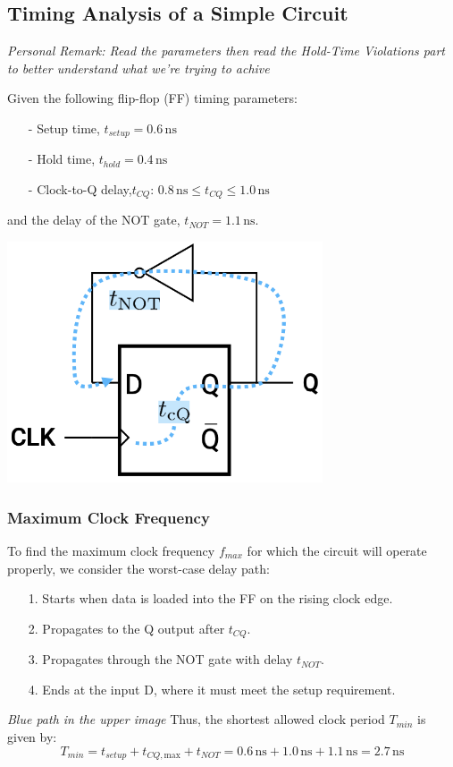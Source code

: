 \documentclass[12pt,openany]{book}
\begin{document}
\subsection{Timing Analysis of a Simple Circuit}
\textit{Personal Remark: Read the parameters then read the Hold-Time Violations part to better understand what we're trying to achive} \newline \vspace*{5px}
\begin{minipage}{0.4\textwidth}
	Given the following flip-flop (FF) timing parameters:
	\begin{itemize}
	    \item[-] Setup time, $t_{setup} = 0.6 \, \text{ns}$
	    \item[-] Hold time, $t_{hold} = 0.4 \, \text{ns}$
	    \item[-] Clock-to-Q delay,\newline $t_{CQ}$: $0.8 \, \text{ns} \le t_{CQ} \le 1.0 \, \text{ns}$
	\end{itemize}
	and the delay of the NOT gate, $t_{NOT} = 1.1 \, \text{ns}$.
\end{minipage}
\hfill
\begin{minipage}{0.5\textwidth}
	\centering
	\includegraphics[width=0.7\textwidth]{circuits/15.1.2_4.png}
\end{minipage}
\subsubsection{Maximum Clock Frequency}

To find the maximum clock frequency $f_{max}$ for which the circuit will operate properly, we consider the worst-case delay path:
\begin{itemize}
    \item[1.] Starts when data is loaded into the FF on the rising clock edge.
    \item[2.] Propagates to the Q output after $t_{CQ}$.
    \item[3.] Propagates through the NOT gate with delay $t_{NOT}$.
    \item[4.] Ends at the input D, where it must meet the setup requirement.
\end{itemize}
\textit{Blue path in the upper image} \newline
Thus, the shortest allowed clock period $T_{min}$ is given by:
\[
T_{min} = t_{setup} + t_{CQ,\text{max}} + t_{NOT} = 0.6 \, \text{ns} + 1.0 \, \text{ns} + 1.1 \, \text{ns} = 2.7 \, \text{ns}
\]
\end{document}
